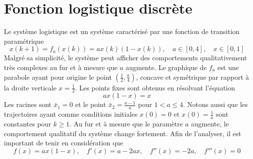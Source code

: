     \section{Fonction logistique discrète}
        Le système logistique est un système caractérisé par une fonction de transition paramétrique
        \begin{equation}
            x(k + 1) = f_a(x(k)) = a x(k)(1 - x(k)), \quad a \in [0, 4], \quad x \in [0, 1]
        \end{equation}
        Malgré sa simplicité, le système peut afficher des comportements qualitativement très complexes au fur et à mesure que $a$ augmente.
        Le graphique de $f_a$ est une parabole ayant pour origine le point $\left(\frac{1}{2}, \frac{a}{4}\right)$, concave et symétrique par rapport à la droite verticale $x = \frac{1}{2}$.
        Les points fixes sont obtenus en résolvant l’équation
        \begin{equation}
            a x (1 - x) = x
        \end{equation}
        Les racines sont $ \bar{x}_1 = 0 $ et le point $\bar{x}_2 = \frac{a - 1}{a}$ pour $1 < a \leq 4$.
        Notons aussi que les trajectoires ayant comme conditions initiales $x(0) = 0$ et $x(0) = \frac{1}{a}$ sont constantes pour $k \geq 1$.
        Au fur et à mesure que le paramètre $a$ augmente, le comportement qualitatif du système change fortement.
        Afin de l’analyser, il est important de tenir en considération que
        \begin{equation}
            f(x) = a x (1 - x), \quad f'(x) = a - 2 a x, \quad f''(x) = -2 a, \quad f'''(x) = 0
        \end{equation}

